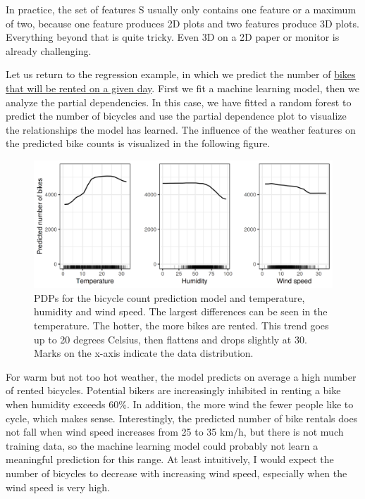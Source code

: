 \documentclass[12pt,]{krantz}
\begin{document}
In practice, the set of features S usually only contains one feature or
a maximum of two, because one feature produces 2D plots and two features
produce 3D plots. Everything beyond that is quite tricky. Even 3D on a
2D paper or monitor is already challenging.

Let us return to the regression example, in which we predict the number
of \protect\hyperlink{bike-data}{bikes that will be rented on a given
day}. First we fit a machine learning model, then we analyze the partial
dependencies. In this case, we have fitted a random forest to predict
the number of bicycles and use the partial dependence plot to visualize
the relationships the model has learned. The influence of the weather
features on the predicted bike counts is visualized in the following
figure.

\begin{figure}

{\centering \includegraphics[width=\textwidth]{images/pdp-bike-1} 

}

\caption{PDPs for the bicycle count prediction model and temperature, humidity and wind speed. The largest differences can be seen in the temperature. The hotter, the more bikes are rented. This trend goes up to 20 degrees Celsius, then flattens and drops slightly at 30. Marks on the x-axis indicate the data distribution.}\label{fig:pdp-bike}
\end{figure}

For warm but not too hot weather, the model predicts on average a high
number of rented bicycles. Potential bikers are increasingly inhibited
in renting a bike when humidity exceeds 60\%. In addition, the more wind
the fewer people like to cycle, which makes sense. Interestingly, the
predicted number of bike rentals does not fall when wind speed increases
from 25 to 35 km/h, but there is not much training data, so the machine
learning model could probably not learn a meaningful prediction for this
range. At least intuitively, I would expect the number of bicycles to
decrease with increasing wind speed, especially when the wind speed is
very high.
\end{document}
